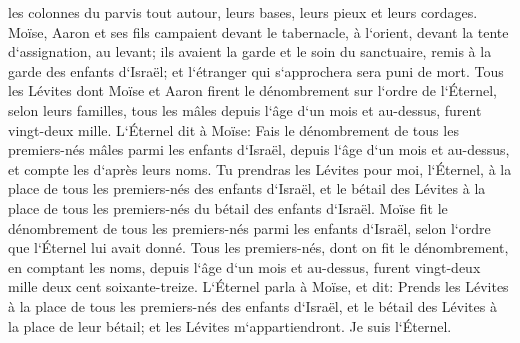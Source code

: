 \verse les colonnes du parvis tout autour, leurs bases, leurs pieux et leurs cordages. 
\verse Moïse, Aaron et ses fils campaient devant le tabernacle, à l`orient, devant la tente d`assignation, au levant; ils avaient la garde et le soin du sanctuaire, remis à la garde des enfants d`Israël; et l`étranger qui s`approchera sera puni de mort. 
\verse Tous les Lévites dont Moïse et Aaron firent le dénombrement sur l`ordre de l`Éternel, selon leurs familles, tous les mâles depuis l`âge d`un mois et au-dessus, furent vingt-deux mille. 
\verse L`Éternel dit à Moïse: Fais le dénombrement de tous les premiers-nés mâles parmi les enfants d`Israël, depuis l`âge d`un mois et au-dessus, et compte les d`après leurs noms. 
\verse Tu prendras les Lévites pour moi, l`Éternel, à la place de tous les premiers-nés des enfants d`Israël, et le bétail des Lévites à la place de tous les premiers-nés du bétail des enfants d`Israël. 
\verse Moïse fit le dénombrement de tous les premiers-nés parmi les enfants d`Israël, selon l`ordre que l`Éternel lui avait donné. 
\verse Tous les premiers-nés, dont on fit le dénombrement, en comptant les noms, depuis l`âge d`un mois et au-dessus, furent vingt-deux mille deux cent soixante-treize. 
\verse L`Éternel parla à Moïse, et dit: 
\verse Prends les Lévites à la place de tous les premiers-nés des enfants d`Israël, et le bétail des Lévites à la place de leur bétail; et les Lévites m`appartiendront. Je suis l`Éternel. 
